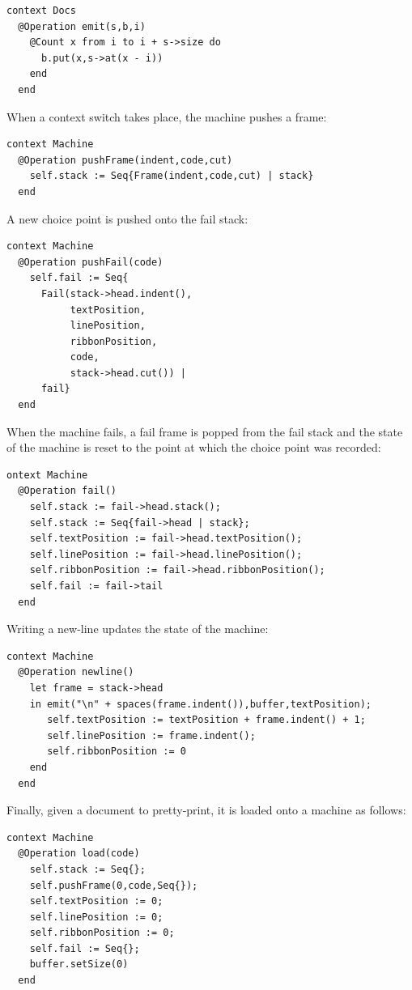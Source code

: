 \begin{lstlisting}
context Docs
  @Operation emit(s,b,i)
    @Count x from i to i + s->size do
      b.put(x,s->at(x - i))
    end
  end
\end{lstlisting}When a context switch takes place, the machine pushes a frame:

\begin{lstlisting}
context Machine
  @Operation pushFrame(indent,code,cut)
    self.stack := Seq{Frame(indent,code,cut) | stack}
  end
\end{lstlisting}A new choice point is pushed onto the fail stack:

\begin{lstlisting}
context Machine
  @Operation pushFail(code)
    self.fail := Seq{
      Fail(stack->head.indent(),
           textPosition,
           linePosition,
           ribbonPosition,
           code,
           stack->head.cut()) | 
      fail}
  end
\end{lstlisting}When the machine fails, a fail frame is popped from the fail stack
and the state of the machine is reset to the point at which the choice
point was recorded:

\begin{lstlisting}
ontext Machine
  @Operation fail()
    self.stack := fail->head.stack();
    self.stack := Seq{fail->head | stack};
    self.textPosition := fail->head.textPosition();
    self.linePosition := fail->head.linePosition();
    self.ribbonPosition := fail->head.ribbonPosition();
    self.fail := fail->tail
  end
\end{lstlisting}Writing a new-line updates the state of the machine:

\begin{lstlisting}
context Machine
  @Operation newline()
    let frame = stack->head
    in emit("\n" + spaces(frame.indent()),buffer,textPosition);
       self.textPosition := textPosition + frame.indent() + 1;
       self.linePosition := frame.indent();
       self.ribbonPosition := 0
    end
  end
\end{lstlisting}Finally, given a document to pretty-print, it is loaded onto a machine
as follows:

\begin{lstlisting}
context Machine
  @Operation load(code)
    self.stack := Seq{};
    self.pushFrame(0,code,Seq{});
    self.textPosition := 0;
    self.linePosition := 0;
    self.ribbonPosition := 0;
    self.fail := Seq{};
    buffer.setSize(0)
  end
\end{lstlisting}
